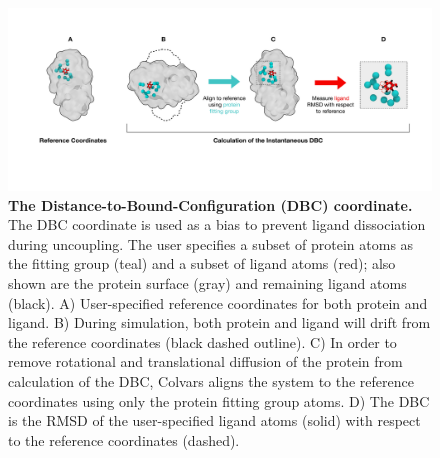 \documentclass[9pt,tutorial]{Styling/livecoms}
\begin{document}
\onecolumn
\begin{figure}[h]
    \centering
    \includegraphics[width=\textwidth]{DBCfigfinal.pdf}
    \caption{\textbf{The Distance-to-Bound-Configuration (DBC) coordinate.} The DBC coordinate is used as a bias to prevent ligand dissociation during uncoupling. The user specifies a subset of protein atoms as the fitting group (teal) and a subset of ligand atoms (red); also shown are the protein surface (gray) and remaining ligand atoms (black). A) User-specified reference coordinates for both protein and ligand.    %
    B) During simulation, both protein and ligand will drift from the reference coordinates (black dashed outline).   
    C) In order to remove rotational and translational diffusion of the protein from calculation of the DBC, Colvars aligns the system to the reference coordinates using only the protein fitting group atoms. 
    D) The DBC is the RMSD of the user-specified ligand atoms (solid) with respect to the reference coordinates (dashed).}
    \label{fig:DBC}
\end{figure}
\twocolumn
\end{document}
